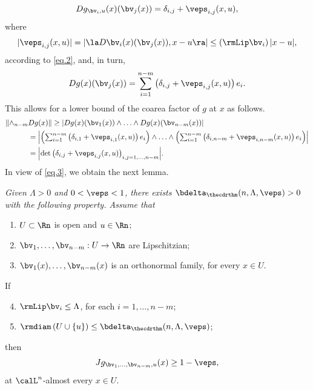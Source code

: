 \begin{Empty}
\begin{equation*}
Dg_{\bv_i,u}(x)(\bv_j(x)) = \delta_{i,j} + \veps_{i,j}(x,u),
\end{equation*}
where
\begin{equation}
\label{eq.3}
|\veps_{i,j}(x,u)| = \left| \la D\bv_i(x)(\bv_j(x)), x-u \ra\right| \leq \left(\rmLip \bv_i \right) |x-u|,
\end{equation}
according to \eqref{eq.2}, and, in turn,
\begin{equation*}
Dg(x)(\bv_j(x)) = \sum_{i=1}^{n-m} \left(\delta_{i,j} + \veps_{i,j}(x,u)\right) e_i.
\end{equation*}
This allows for a lower bound of the coarea factor of $g$ at $x$ as follows.
\begin{equation*}
\begin{split}
\|{\wedge}_{n-m}&Dg(x)\|  \geq \left| Dg(x)(\bv_1(x)) \wedge \ldots \wedge Dg(x)(\bv_{n-m}(x)) \right| \\
&\textstyle = \left| \left(\sum_{i=1}^{n-m} \left(\delta_{i,1} + \veps_{i,1}(x,u)\right) e_i \right) \wedge \ldots \wedge \left(\sum_{i=1}^{n-m} \left(\delta_{i,n-m} + \veps_{i,n-m}(x,u)\right) e_i \right) \right| \\
& \textstyle = \Bigl| \det \left(\delta_{i,j} + \veps_{i,j}(x,u) \right)_{i,j=1,\ldots,n-m} \Bigr|.
\end{split}
\end{equation*}
In view of \eqref{eq.3}, we obtain the next lemma.
\end{Empty}

\begin{Empty}[]
\label{jac.g}
{\it
Given $\Lambda > 0$ and $0 < \veps < 1$, there exists $\bdelta_{\thecdrthm}(n,\Lambda,\veps) > 0$ with the following property. Assume that
\begin{enumerate}
\item $U \subset \Rn$ is open and $u \in \Rn$;
\item $\bv_1,\ldots,\bv_{n-m}: U \to \Rn$ are Lipschitzian;
\item $\bv_1(x),\ldots,\bv_{n-m}(x)$ is an orthonormal family, for every $x \in U$.
\end{enumerate}
If
\begin{enumerate}\setcounter{enumi}{3}
\item $\rmLip \bv_i \leq \Lambda$, for each $i=1,\ldots,n-m$;
\item $\rmdiam \left(U \cup \{u\} \right) \leq \bdelta_{\thecdrthm}(n,\Lambda,\veps)$;
\end{enumerate}
then
\begin{equation*}
Jg_{\bv_1,\ldots,\bv_{n-m},u}(x) \geq 1 - \veps,
\end{equation*}
at $\calL^n$-almost every $x \in U$.
}
\end{Empty}

